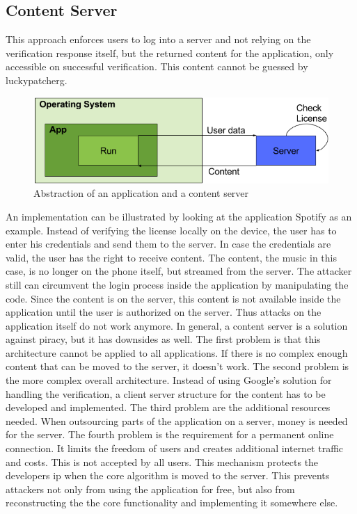 \subsection{Content Server} \label{section:counter-replace-server}
This approach enforces users to log into a server and not relying on the verification response itself, but the returned content for the application, only accessible on successful verification.
This content cannot be guessed by \gls{luckypatcherg}.
\newline
\begin{figure}[h]
    \centering
    \includegraphics[width=1\textwidth]{data/contentServer.png}
    \caption{Abstraction of an application and a content server}
    \label{fig:contentServer}
\end{figure}
\newline
An implementation can be illustrated by looking at the application Spotify \cite{spotify} as an example.
Instead of verifying the license locally on the device, the user has to enter his credentials and send them to the server.
In case the credentials are valid, the user has the right to receive content.
The content, the music in this case, is no longer on the phone itself, but streamed from the server.
The attacker still can circumvent the login process inside the application by manipulating the code.
Since the content is on the server, this content is not available inside the application until the user is authorized on the server.
Thus attacks on the application itself do not work anymore.
\newline
\newline
In general, a content server is a solution against piracy, but it has downsides as well.
The first problem is that this architecture cannot be applied to all applications.
If there is no complex enough content that can be moved to the server, it doesn't work.
\newline
The second problem is the more complex overall architecture.
Instead of using Google's solution for handling the verification, a client server structure for the content has to be developed and implemented.
\newline
The third problem are the additional resources needed.
When outsourcing parts of the application on a server, money is needed for the server.
\newline
The fourth problem is the requirement for a permanent online connection.
It limits the freedom of users and creates additional internet traffic and costs.
This is not accepted by all users.
\newline
\newline
This mechanism protects the developers \gls{ip} when the core algorithm is moved to the server.
This prevents attackers not only from using the application for free, but also from reconstructing the the core functionality and implementing it somewhere else.
